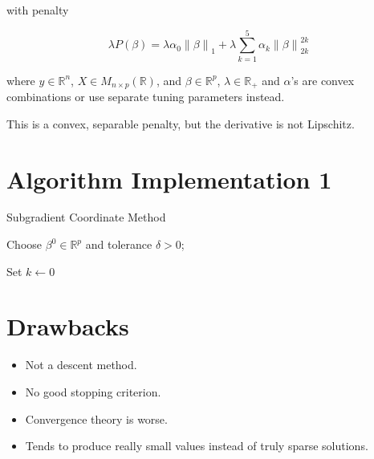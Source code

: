 \documentclass[10pt, reqno]{article}
\numberwithin{equation}{section}
\newcommand{\norm}[1]{\left\lVert#1\right\rVert}
\newcommand{\R}{\mathbb{R}}
\begin{document}
with penalty

\[
\lambda P(\beta) = \lambda \alpha_0 \norm{\beta}_1 + \lambda \sum_{k = 1}^{5} \alpha_k \norm{\beta}_{2k}^{2k} 
\]

where $y \in \R^n$, $X \in M_{n \times p}(\R)$, and $\beta \in \R^p$, $\lambda \in \R_{+}$ and $\alpha$'s are convex combinations or use separate tuning parameters instead.

\vspace{1cm}
This is a convex, separable penalty, but the derivative is not Lipschitz.

\newpage
\section*{Algorithm Implementation 1}

\vspace{.5cm}
\begin{algorithm}[H]
\caption{Subgradient Coordinate Method}
Choose $\beta^0 \in \R^p$ and tolerance $\delta > 0$;

Set $k \gets 0$


\end{algorithm}

\newpage
\section*{Drawbacks}

\begin{itemize}
\item Not a descent method.

\item No good stopping criterion.

\item Convergence theory is worse.

\item Tends to produce really small values instead of truly sparse solutions.

\end{itemize}
\end{document}
